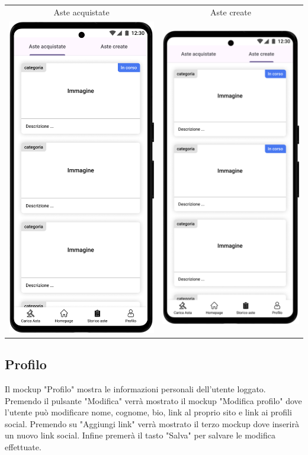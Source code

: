 \begin{center}
	\begin{tabular}{cc}
		Aste acquistate                                                                    &
		Aste create                                                                          \\
		\includegraphics[width=.35\textwidth]{assets/mockup/Storico aste - acquistate.png} &
		\includegraphics[width=.35\textwidth]{assets/mockup/Storico aste - create.png}       \\
	\end{tabular}
\end{center}

\newpage
\subsection{Profilo}
Il mockup "Profilo" mostra le informazioni personali dell'utente loggato.\\
Premendo il pulsante "Modifica" verrà mostrato il mockup "Modifica profilo" dove l'utente può modificare nome, cognome, bio, link al proprio sito e link ai profili social.
Premendo su "Aggiungi link" verrà mostrato il terzo mockup dove inserirà un nuovo link social.\meskip
Infine premerà il tasto "Salva" per salvare le modifica effettuate.

